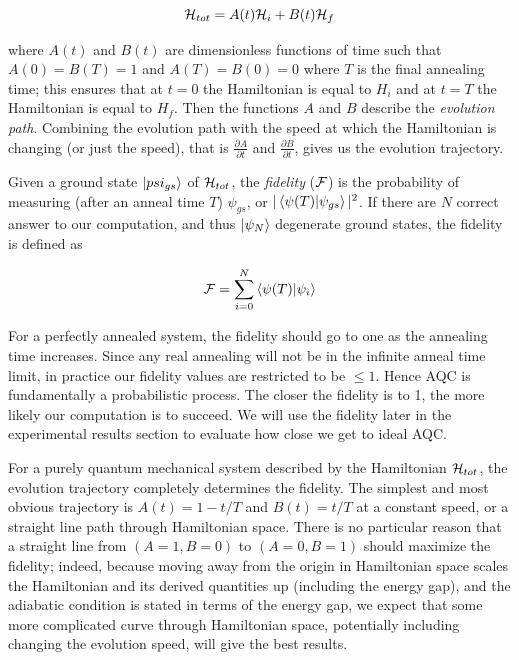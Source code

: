 \begin{equation}
	\mathcal{H}_{tot} = A(t)\mathcal{H}_i + B(t)\mathcal{H}_f
\end{equation}

where $A(t)$ and $B(t)$ are dimensionless functions of time such that $A(0) = B(T) = 1$ and $A(T) = B(0) = 0$ where $T$ is the final annealing time; this ensures that at $t = 0$ the Hamiltonian is equal to $H_i$ and at $t = T$ the Hamiltonian is equal to $H_f$.  Then the functions $A$ and $B$ describe the \emph{evolution path}.  Combining the evolution path with the speed at which the Hamiltonian is changing (or just the speed), that is $\frac{\partial A}{\partial t}$ and $\frac{\partial B}{\partial t}$, gives us the evolution trajectory.  

Given a ground state $\mathinner{|{psi_{gs}}\rangle}$ of $\mathcal{H}_{tot}$, the \emph{fidelity} ($\mathcal{F}$) is the probability of measuring (after an anneal time $T$) $\psi_{gs}$, or $|\mathinner{\langle{\psi(T)|\psi_{gs}}\rangle}|^2$.  If there are $N$ correct answer to our computation, and thus $\mathinner{|{\psi_N}\rangle}$ degenerate ground states, the fidelity is defined as

\begin{equation}
	\mathcal{F} = \sum_{i=0}^N \mathinner{\langle{\psi(T)|\psi_i}\rangle}
\end{equation}

For a perfectly annealed system, the fidelity should go to one as the annealing time increases.  Since any real annealing will not be in the infinite anneal time limit, in practice our fidelity values are restricted to be $\leq 1$.  Hence AQC is fundamentally a probabilistic process.  The closer the fidelity is to 1, the more likely our computation is to succeed.  We will use the fidelity later in the experimental results section to evaluate how close we get to ideal AQC.

For a purely quantum mechanical system described by the Hamiltonian $\mathcal{H}_{tot}$, the evolution trajectory completely determines the fidelity.
The simplest and most obvious trajectory is $A(t) = 1 - t/T$ and $B(t) = t/T$ at a constant speed, or a straight line path through Hamiltonian space.
There is no particular reason that a straight line from $(A=1,B=0)$ to $(A=0,B=1)$ should maximize the fidelity; indeed, because moving away from the origin in Hamiltonian space scales the Hamiltonian and its derived quantities up (including the energy gap), and the adiabatic condition is stated in terms of the energy gap, we expect that some more complicated curve through Hamiltonian space, potentially including changing the evolution speed, will give the best results.


